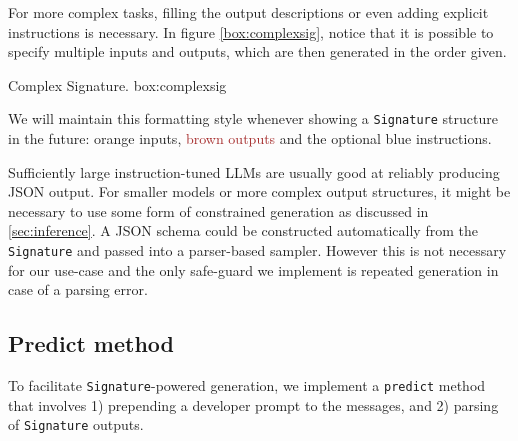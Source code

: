 For more complex tasks, filling the output descriptions or even adding explicit instructions is necessary.
In figure \ref{box:complexsig}, notice that it is possible to specify multiple inputs and outputs, which are then generated in the order given.

\begin{figurebox}{Complex Signature. }{box:complexsig}
\end{figurebox}

We will maintain this formatting style whenever showing a \texttt{Signature} structure in the future: \textcolor{ctuorange}{orange inputs}, \textcolor{brown}{brown outputs} and the optional \textcolor{ctublue}{blue instructions}.

Sufficiently large instruction-tuned LLMs are usually good at reliably producing JSON output.
For smaller models or more complex output structures, it might be necessary to use some form of constrained generation as discussed in \ref{sec:inference}.
A JSON schema could be constructed automatically from the \texttt{Signature} and passed into a parser-based sampler.
However this is not necessary for our use-case and the only safe-guard we implement is repeated generation in case of a parsing error.

\subsection{Predict method}
To facilitate \texttt{Signature}-powered generation, we implement a \texttt{predict} method that 
involves 1) prepending a developer prompt to the messages, and 2) parsing of \texttt{Signature} outputs.

